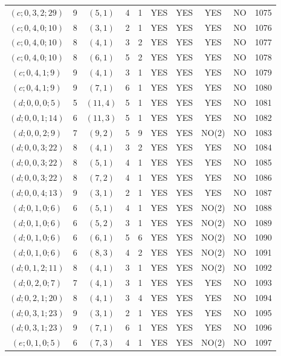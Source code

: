 \begin{longtable}{|c|c|c|c|c|c|c|c|c|c|}
$(c; 0, 3, 2; 29)$ & 9 & $(5, 1)$ & 4 & 1 & YES & YES & YES & NO & 1075\\
$(c; 0, 4, 0; 10)$ & 8 & $(3, 1)$ & 2 & 1 & YES & YES & YES & NO & 1076\\
$(c; 0, 4, 0; 10)$ & 8 & $(4, 1)$ & 3 & 2 & YES & YES & YES & NO & 1077\\
$(c; 0, 4, 0; 10)$ & 8 & $(6, 1)$ & 5 & 2 & YES & YES & YES & NO & 1078\\
$(c; 0, 4, 1; 9)$ & 9 & $(4, 1)$ & 3 & 1 & YES & YES & YES & NO & 1079\\
$(c; 0, 4, 1; 9)$ & 9 & $(7, 1)$ & 6 & 1 & YES & YES & YES & NO & 1080\\
$(d; 0, 0, 0; 5)$ & 5 & $(11, 4)$ & 5 & 1 & YES & YES & YES & NO & 1081\\
$(d; 0, 0, 1; 14)$ & 6 & $(11, 3)$ & 5 & 1 & YES & YES & YES & NO & 1082\\
$(d; 0, 0, 2; 9)$ & 7 & $(9, 2)$ & 5 & 9 & YES & YES & NO(2) & NO & 1083\\
$(d; 0, 0, 3; 22)$ & 8 & $(4, 1)$ & 3 & 2 & YES & YES & YES & NO & 1084\\
$(d; 0, 0, 3; 22)$ & 8 & $(5, 1)$ & 4 & 1 & YES & YES & YES & NO & 1085\\
$(d; 0, 0, 3; 22)$ & 8 & $(7, 2)$ & 4 & 1 & YES & YES & YES & NO & 1086\\
$(d; 0, 0, 4; 13)$ & 9 & $(3, 1)$ & 2 & 1 & YES & YES & YES & NO & 1087\\
$(d; 0, 1, 0; 6)$ & 6 & $(5, 1)$ & 4 & 1 & YES & YES & NO(2) & NO & 1088\\
$(d; 0, 1, 0; 6)$ & 6 & $(5, 2)$ & 3 & 1 & YES & YES & NO(2) & NO & 1089\\
$(d; 0, 1, 0; 6)$ & 6 & $(6, 1)$ & 5 & 6 & YES & YES & NO(2) & NO & 1090\\
$(d; 0, 1, 0; 6)$ & 6 & $(8, 3)$ & 4 & 2 & YES & YES & NO(2) & NO & 1091\\
$(d; 0, 1, 2; 11)$ & 8 & $(4, 1)$ & 3 & 1 & YES & YES & NO(2) & NO & 1092\\
$(d; 0, 2, 0; 7)$ & 7 & $(4, 1)$ & 3 & 1 & YES & YES & YES & NO & 1093\\
$(d; 0, 2, 1; 20)$ & 8 & $(4, 1)$ & 3 & 4 & YES & YES & YES & NO & 1094\\
$(d; 0, 3, 1; 23)$ & 9 & $(3, 1)$ & 2 & 1 & YES & YES & YES & NO & 1095\\
$(d; 0, 3, 1; 23)$ & 9 & $(7, 1)$ & 6 & 1 & YES & YES & YES & NO & 1096\\
$(e; 0, 1, 0; 5)$ & 6 & $(7, 3)$ & 4 & 1 & YES & YES & NO(2) & NO & 1097\\

\end{longtable}
